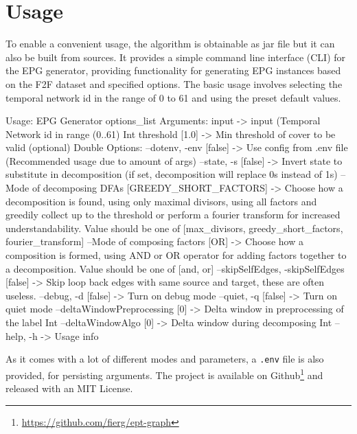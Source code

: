 \section{Usage}
\label{ch:Implementation:usage}
To enable a convenient usage, the algorithm is obtainable as jar file but it can also be built from sources.
It provides a simple command line interface (CLI) for the EPG generator, providing functionality for generating EPG instances based on the F2F dataset and specified options.
The basic usage involves selecting the temporal network id in the range of 0 to 61 and using the preset default values.

\begin{verbnobox}[\fontsize{10.5pt}{10.5pt}\selectfont]
Usage: EPG Generator options_list
Arguments: 
input -> input (Temporal Network id in range (0..61) { Int }
threshold [1.0] -> Min threshold of cover to be valid (optional) { Double }
Options: 
--dotenv, -env [false] -> Use config from .env file
		(Recommended usage due to amount of args) 
--state, -s [false] -> Invert state to substitute in decomposition
		(if set, decomposition will replace 0s instead of 1s) 
--Mode of decomposing DFAs [GREEDY_SHORT_FACTORS] -> Choose how
		a decomposition is found, using only maximal divisors,
		using all factors and greedily collect up to the threshold
		or perform a fourier transform for increased understandability.
		{ Value should be one of [max_divisors, greedy_short_factors,
 		fourier_transform] }
--Mode of composing factors [OR] -> Choose how a composition is formed,
		using AND or OR operator for adding factors together to
		a decomposition. { Value should be one of [and, or] }
--skipSelfEdges, -skipSelfEdges [false] -> Skip loop back edges
		with same source and target, these are often useless. 
--debug, -d [false] -> Turn on debug mode 
--quiet, -q [false] -> Turn on quiet mode 
--deltaWindowPreprocessing [0] -> Delta window
		 in preprocessing of the label { Int }
--deltaWindowAlgo [0] -> Delta window during decomposing { Int }
--help, -h -> Usage info 
\end{verbnobox}
As it comes with a lot of different modes and parameters, a \verb*|.env| file is also provided, for persisting arguments.
The project is available on Github\footnote{\url{https://github.com/fierg/ept-graph}} and released with an MIT License.